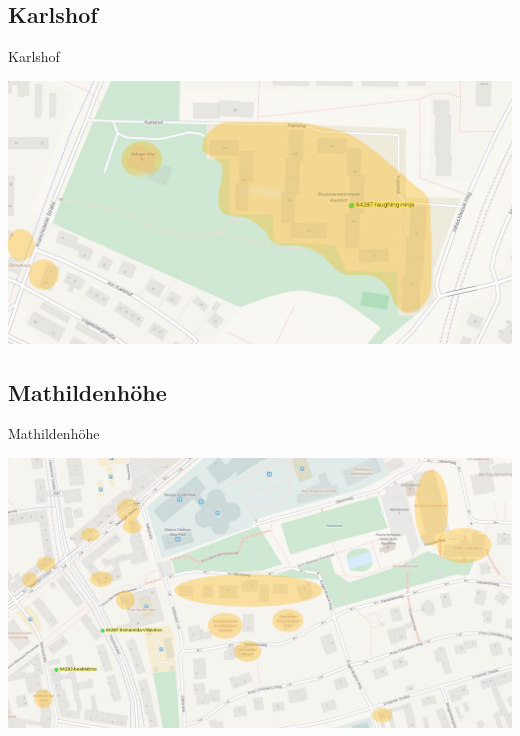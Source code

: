 \documentclass{beamer}
\begin{document}
\subsection{Karlshof}
\begin{frame}{Karlshof}
\begin{center}
\includegraphics[width=\textwidth]{karlshof2}
\end{center}
\end{frame}

\subsection{Mathildenhöhe}
\begin{frame}{Mathildenhöhe}
\begin{center}
\includegraphics[width=\textwidth]{mathildenhoehe2}
\end{center}
\end{frame}
\end{document}

